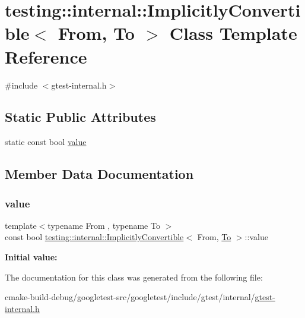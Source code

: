 \hypertarget{classtesting_1_1internal_1_1ImplicitlyConvertible}{}\section{testing\+::internal\+::Implicitly\+Convertible$<$ From, To $>$ Class Template Reference}
\label{classtesting_1_1internal_1_1ImplicitlyConvertible}


{\ttfamily \#include $<$gtest-\/internal.\+h$>$}

\subsection*{Static Public Attributes}
\begin{DoxyCompactItemize}
\item 
static const bool \mbox{\hyperlink{classtesting_1_1internal_1_1ImplicitlyConvertible_aea51cecabca681fb75659e224771b7b7}{value}}
\end{DoxyCompactItemize}


\subsection{Member Data Documentation}
\mbox{\label{classtesting_1_1internal_1_1ImplicitlyConvertible_aea51cecabca681fb75659e224771b7b7}} 
\subsubsection{\texorpdfstring{value}{value}}
{\footnotesize\ttfamily template$<$typename From , typename To $>$ \\
const bool \mbox{\hyperlink{classtesting_1_1internal_1_1ImplicitlyConvertible}{testing\+::internal\+::\+Implicitly\+Convertible}}$<$ From, \mbox{\hyperlink{classtesting_1_1internal_1_1To}{To}} $>$\+::value\hspace{0.3cm}{\ttfamily [static]}}

{\bfseries Initial value\+:}
\begin{DoxyCode}{0}
\DoxyCodeLine{=}

\end{DoxyCode}


The documentation for this class was generated from the following file\+:\begin{DoxyCompactItemize}
\item 
cmake-\/build-\/debug/googletest-\/src/googletest/include/gtest/internal/\mbox{\hyperlink{gtest-internal_8h}{gtest-\/internal.\+h}}\end{DoxyCompactItemize}
